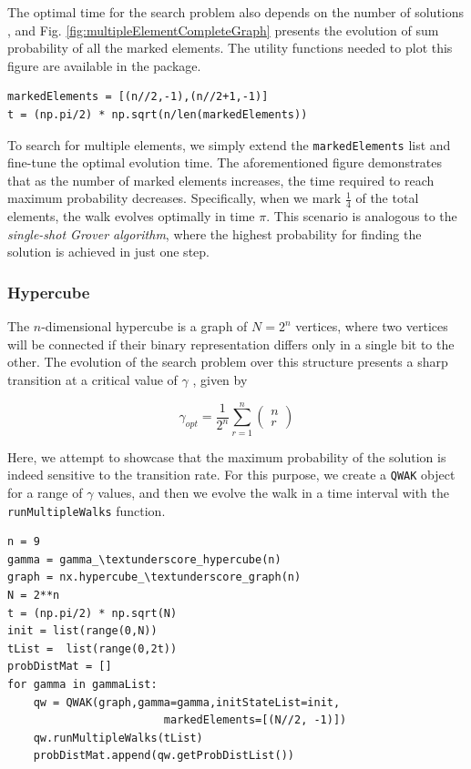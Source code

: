 \documentclass[../../dissertation.tex]{subfiles}
\begin{document}
The optimal time for the search problem also depends on the number of solutions
\cite{boyer1996,Lugao2022}, and Fig. \ref{fig:multipleElementCompleteGraph}
presents the evolution of sum probability of all the marked elements. The
utility functions needed to plot this figure are available in the package. 

\begin{lstlisting}[style=code]
markedElements = [(n//2,-1),(n//2+1,-1)]
t = (np.pi/2) * np.sqrt(n/len(markedElements))
\end{lstlisting}

To search for multiple elements, we simply extend the \texttt{markedElements}
list and fine-tune the optimal evolution time. The aforementioned figure
demonstrates that as the number of marked elements increases, the time required
to reach maximum probability decreases. Specifically, when we mark $
\frac{1}{4} $ of the total elements, the walk evolves optimally in time $\pi$.
This scenario is analogous to the \textit{single-shot Grover algorithm}, where
the highest probability for finding the solution is achieved in just one step.

\subsubsection{Hypercube}

The $n$-dimensional hypercube is a graph of $N=2^n$ vertices, where two
vertices will be connected if their binary representation differs only in a
single bit to the other. The evolution of the search problem over this
structure presents a sharp transition at a critical value of $\gamma$ \cite{childs2004}, given by

\begin{equation}
    \gamma_{opt} =\frac{1}{2^n} \sum_{r=1}^n\left(\begin{array}{l}
        n \\
        r
        \end{array}\right) %
\end{equation}

Here, we attempt to showcase that the maximum probability of the solution is
indeed sensitive to the transition rate. For this purpose, we create a
\texttt{QWAK} object for a range of $\gamma$ values, and then we evolve the
walk in a time interval with the \texttt{runMultipleWalks} function.

\begin{lstlisting}[style=code,escapeinside={__}]
n = 9
gamma = gamma_\textunderscore_hypercube(n)
graph = nx.hypercube_\textunderscore_graph(n)
N = 2**n
t = (np.pi/2) * np.sqrt(N)
init = list(range(0,N))
tList =  list(range(0,2t))
probDistMat = []
for gamma in gammaList:
    qw = QWAK(graph,gamma=gamma,initStateList=init,
                        markedElements=[(N//2, -1)])
    qw.runMultipleWalks(tList)
    probDistMat.append(qw.getProbDistList())
\end{lstlisting}
\end{document}

